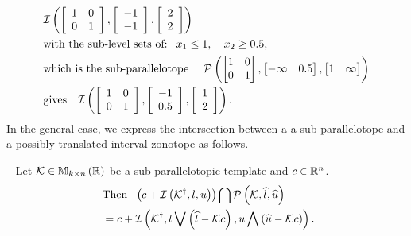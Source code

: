 \begin{align*}
& \mathit{\operatorname{\mathcal{I}}}\left(\left[\begin{array}{l l}1 & 0 \\ 0 &
      1\end{array}\right],\left[\begin{array}{c}-1\\ -1\end{array}\right],\left[\begin{array}{c}2\\ 2\end{array}\right]\right)\\
&\text{with the sub-level sets of: }~
x_1\leq 1,\hspace{1em}
  x_2\geq 0.5,\\
&\text{which is the sub-parallelotope}~~~~ \mathcal{P}\left(\left[\begin{matrix}1&
  0\\0&1\end{matrix}\right],\left[\begin{matrix}-\infty& 0.5\end{matrix}\right],\left[\begin{matrix}1&\infty\end{matrix}\right]\right)\\
& \text{gives}~~~\mathit{\operatorname{\mathcal{I}}}\left(\left[\begin{array}{l
        l}1 & 0 \\ 0 &
      1\end{array}\right],\left[\begin{array}{c}-1\\ 0.5\end{array}\right],\left[\begin{array}{c}1\\ 2\end{array}\right]\right).
\end{align*}
%
In the general case, we express the intersection between a
a sub-parallelotope and a possibly translated interval
zonotope as follows.
%
\begin{lemma}~\label{lem:motivation}
  Let $\mathcal{K}\in\mathbb{M}_{k\times n}\left(\mathbb{R}\right)$ be a sub-parallelotopic template
  and  ${c\in\mathbb{R}^n}$.
%
\begin{align}~\label{eqn:motivation}
& \text{Then}~~\left(c+\mathit{\operatorname{\mathcal{I}}}\left({\mathcal{K}}^\dagger,l,u\right)\right)\bigcap\mathcal{P}\left(\mathcal{K},\widehat{l},\widehat{u}\right)\nonumber\\
& =c+\mathit{\operatorname{\mathcal{I}}}\left({\mathcal{K}}^\dagger,l\bigvee \left(\widehat{l}-\mathcal{K}c\right),u\bigwedge \left(\widehat{u}-\mathcal{K}c\right)\right).
\end{align}
%
\end{lemma}
%
